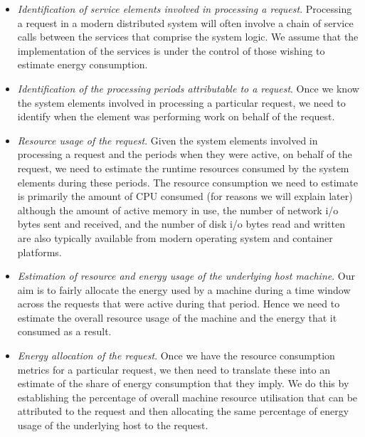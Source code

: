 \begin{itemize}

\item \emph{Identification of service elements involved in processing a request}.  Processing a request in a modern distributed system will often involve a chain of service calls between the services that comprise the system logic.  We assume that the implementation of the services is under the control of those wishing to estimate energy consumption.

\item \emph{Identification of the processing periods attributable to a request}.  Once we know the system elements involved in processing a particular request, we need to identify when the element was performing work on behalf of the request.

\item \emph{Resource usage of the request}.  Given the system elements involved in processing a request and the periods when they were active, on behalf of the request, we need to estimate the runtime resources consumed by the system elements during these periods.  The resource consumption we need to estimate is primarily the amount of CPU consumed (for reasons we will explain later) although the amount of active memory in use, the number of network i/o bytes sent and received, and the number of disk i/o bytes read and written are also typically available from modern operating system and container platforms.

\item \emph{Estimation of resource and energy usage of the underlying host machine}.  Our aim is to fairly allocate the energy used by a machine during a time window across the requests that were active during that period.  Hence we need to estimate the overall resource usage of the machine and the energy that it consumed as a result.  


\item \emph{Energy allocation of the request}.  Once we have the resource consumption metrics for a particular request, we then need to translate these into an estimate of the share of energy consumption that they imply.  We do this by establishing the percentage of overall machine resource utilisation that can be attributed to the request and then allocating the same percentage of energy usage of the underlying host to the request.


\end{itemize}

